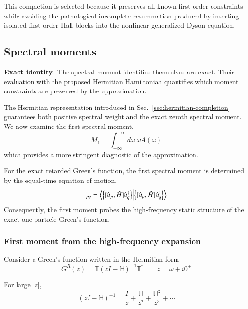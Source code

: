 \documentclass[aip,jcp,reprint,noshowkeys,superscriptaddress]{revtex4-1}
\newcommand{\Exact}{\textbf{Exact identity.}\ }
\begin{document}
This completion is selected because it preserves all known first-order
constraints while avoiding the pathological incomplete resummation
produced by inserting isolated first-order Hall blocks into the
nonlinear generalized Dyson equation.
\subsection{Spectral moments}
\label{sec:first-spectral-moment}

\Exact The spectral-moment identities themselves are exact.  Their
evaluation with the proposed Hermitian Hamiltonian quantifies which moment
constraints are preserved by the approximation.


The Hermitian representation introduced in
Sec.~\ref{sec:hermitian-completion} guarantees both positive spectral
weight and the exact zeroth spectral moment.  We now examine the first
spectral moment,
\begin{equation}
  M_1
  =
  \int_{-\infty}^{+\infty}
  d\omega\
  \omega A(\omega)
  \label{eq:first-moment-def}
\end{equation}
which provides a more stringent diagnostic of the approximation.

For the exact retarded Green's function, the first spectral moment is
determined by the equal-time equation of motion,
\begin{equation}
  [M_1^{\rm exact}]_{pq}
  =
  \braket{
    \left\{
      [\hat a_p,\hat H]
      \hat a_q^\dagger
    \right\}
  }
  \label{eq:exact-first-moment-commutator}
\end{equation}
Consequently, the first moment probes the high-frequency static
structure of the exact one-particle Green's function.


\subsubsection{First moment from the high-frequency expansion}

Consider a Green's function written in the Hermitian form
\begin{equation}
  G^R(z)
  =
  \mathbb T
  \left(
    zI-\mathbb H
  \right)^{-1}
  \mathbb T^\dagger
  \qquad
  z=\omega+i0^+
  \label{eq:G-Hermitian-general-moment}
\end{equation}

For large $|z|$,
\begin{equation}
  \left(
    zI-\mathbb H
  \right)^{-1}
  =
  \frac{I}{z}
  +
  \frac{\mathbb H}{z^2}
  +
  \frac{\mathbb H^2}{z^3}
  +
  \cdots
\end{equation}
\end{document}
